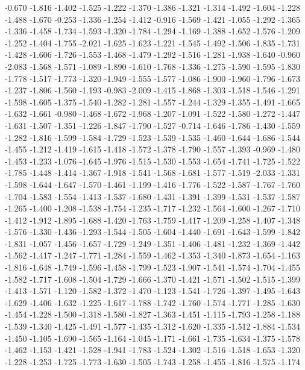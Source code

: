 \documentclass[9pt]{article}
\theoremstyle{plain}
\theoremstyle{definition}
\theoremstyle{remark}
\numberwithin{equation}{section}
\begin{document}
-0.670
-1.816
-1.402
-1.525
-1.222
-1.370
-1.386
-1.321
-1.314
-1.492
-1.604
-1.228
-1.488
-1.670
-0.253
-1.336
-1.254
-1.412
-0.916
-1.569
-1.421
-1.055
-1.292
-1.365
-1.336
-1.458
-1.734
-1.593
-1.320
-1.784
-1.294
-1.169
-1.388
-1.652
-1.576
-1.209
-1.252
-1.404
-1.755
-2.021
-1.625
-1.623
-1.221
-1.545
-1.492
-1.506
-1.835
-1.731
-1.428
-1.606
-1.726
-1.553
-1.468
-1.479
-1.292
-1.516
-1.281
-1.938
-1.640
-0.960
-2.083
-1.568
-1.571
-1.089
-1.890
-1.610
-1.768
-1.336
-1.275
-1.590
-1.595
-1.830
-1.778
-1.517
-1.773
-1.320
-1.949
-1.555
-1.577
-1.086
-1.900
-1.960
-1.796
-1.673
-1.237
-1.806
-1.560
-1.193
-0.983
-2.009
-1.415
-1.868
-1.303
-1.518
-1.546
-1.291
-1.598
-1.605
-1.375
-1.540
-1.282
-1.281
-1.557
-1.244
-1.329
-1.355
-1.491
-1.665
-1.632
-1.661
-0.980
-1.468
-1.672
-1.968
-1.207
-1.091
-1.522
-1.580
-1.272
-1.447
-1.631
-1.507
-1.351
-1.226
-1.847
-1.790
-1.527
-0.714
-1.646
-1.786
-1.430
-1.559
-1.282
-1.816
-1.599
-1.584
-1.729
-1.523
-1.539
-1.535
-1.460
-1.644
-1.686
-1.544
-1.455
-1.212
-1.419
-1.615
-1.418
-1.572
-1.378
-1.790
-1.557
-1.393
-0.969
-1.480
-1.453
-1.233
-1.076
-1.645
-1.976
-1.515
-1.530
-1.553
-1.654
-1.741
-1.725
-1.522
-1.785
-1.448
-1.414
-1.367
-1.918
-1.541
-1.568
-1.681
-1.577
-1.519
-2.033
-1.331
-1.598
-1.644
-1.647
-1.570
-1.461
-1.199
-1.416
-1.776
-1.522
-1.587
-1.767
-1.760
-1.704
-1.583
-1.554
-1.413
-1.537
-1.680
-1.431
-1.391
-1.399
-1.531
-1.537
-1.587
-1.265
-1.400
-1.208
-1.538
-1.754
-1.235
-1.717
-1.232
-1.564
-1.600
-1.267
-1.710
-1.412
-1.912
-1.895
-1.688
-1.420
-1.763
-1.759
-1.417
-1.209
-1.258
-1.407
-1.348
-1.576
-1.330
-1.436
-1.293
-1.544
-1.505
-1.604
-1.440
-1.691
-1.643
-1.599
-1.842
-1.831
-1.057
-1.456
-1.657
-1.729
-1.249
-1.351
-1.406
-1.481
-1.232
-1.369
-1.442
-1.562
-1.417
-1.247
-1.771
-1.284
-1.559
-1.462
-1.353
-1.340
-1.873
-1.654
-1.163
-1.816
-1.648
-1.749
-1.596
-1.458
-1.799
-1.523
-1.907
-1.541
-1.574
-1.704
-1.455
-1.582
-1.717
-1.608
-1.504
-1.729
-1.666
-1.370
-1.421
-1.571
-1.502
-1.515
-1.399
-1.413
-1.571
-1.120
-1.582
-1.372
-1.470
-1.123
-1.541
-1.726
-1.397
-1.495
-1.643
-1.629
-1.406
-1.632
-1.225
-1.617
-1.788
-1.742
-1.760
-1.574
-1.771
-1.285
-1.630
-1.454
-1.228
-1.500
-1.318
-1.580
-1.827
-1.363
-1.451
-1.115
-1.793
-1.258
-1.188
-1.539
-1.340
-1.425
-1.491
-1.577
-1.435
-1.312
-1.620
-1.335
-1.512
-1.884
-1.534
-1.450
-1.105
-1.690
-1.565
-1.164
-1.045
-1.171
-1.661
-1.735
-1.634
-1.375
-1.578
-1.462
-1.153
-1.421
-1.528
-1.941
-1.783
-1.524
-1.302
-1.516
-1.518
-1.653
-1.320
-1.228
-1.253
-1.725
-1.773
-1.630
-1.505
-1.743
-1.258
-1.455
-1.816
-1.575
-1.174
\end{document}
